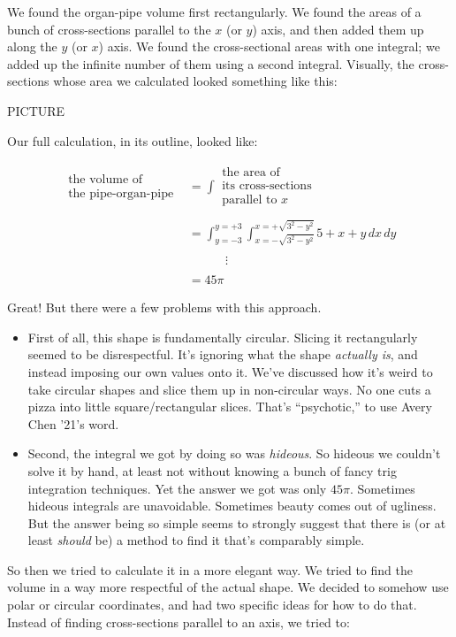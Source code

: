 \documentclass[
]{article}
\begin{document}
We found the organ-pipe volume first rectangularly. We found the areas of a bunch of cross-sections parallel to the \(x\) (or \(y\)) axis, and then added them up along the \(y\) (or \(x\)) axis. We found the cross-sectional areas with one integral; we added up the infinite number of them using a second integral. Visually, the cross-sections whose area we calculated looked something like this:

PICTURE

Our full calculation, in its outline, looked like:

\begin{align*}
\substack{\text{the volume of}\\\text{the pipe-organ-pipe}} &= \int \!\substack{\text{the area of}\\\text{its cross-sections}\\\text{parallel to $x$}} \\ \\
&= \int_{y=-3}^{y=+3} \int_{x=-\sqrt{3^2-y^2}}^{x=+\sqrt{3^2-y^2}} 5+x+y\,dx\,dy \\ \\
&\quad\quad\quad\vdots \\ \\
&= 45\pi
\end{align*}

Great! But there were a few problems with this approach.

\begin{itemize}
\item
  First of all, this shape is fundamentally circular. Slicing it rectangularly seemed to be disrespectful. It's ignoring what the shape \emph{actually is}, and instead imposing our own values onto it. We've discussed how it's weird to take circular shapes and slice them up in non-circular ways. No one cuts a pizza into little square/rectangular slices. That's ``psychotic,'' to use Avery Chen '21's word.
\item
  Second, the integral we got by doing so was \emph{hideous}. So hideous we couldn't solve it by hand, at least not without knowing a bunch of fancy trig integration techniques. Yet the answer we got was only \(45\pi\). Sometimes hideous integrals are unavoidable. Sometimes beauty comes out of ugliness. But the answer being so simple seems to strongly suggest that there is (or at least \emph{should} be) a method to find it that's comparably simple.
\end{itemize}

So then we tried to calculate it in a more elegant way. We tried to find the volume in a way more respectful of the actual shape. We decided to somehow use polar or circular coordinates, and had two specific ideas for how to do that. Instead of finding cross-sections parallel to an axis, we tried to:
\end{document}
